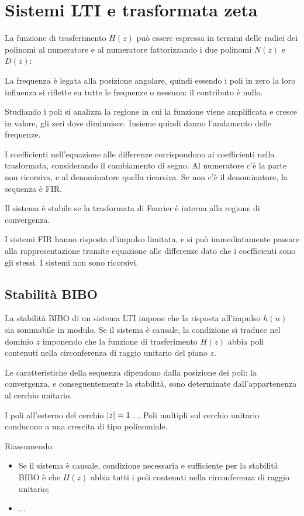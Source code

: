 \section{Sistemi LTI e trasformata zeta}
La funzione di trasferimento $H(z)$ può essere espressa in termini delle radici dei polinomi al numeratore e al numeratore fattorizzando i due polinomi $N(z)$ e $D(z)$:

La frequenza è legata alla posizione angolare, quindi essendo i poli in zero la loro influenza si riflette su tutte le frequenze o nessuna: il contributo è nullo.

Studiando i poli si analizza la regione in cui la funzione viene amplificata e cresce in valore, gli zeri dove diminuisce. Insieme quindi danno l'andamento delle frequenze.

I coefficienti nell'equazione alle differenze corrispondono ai coefficienti nella trasformata, considerando il cambiamento di segno. Al numeratore c'è la parte non ricorsiva, e al denominatore quella ricorsiva. Se non c'è il denominatore, la sequenza è FIR.

Il sistema è stabile se la trasformata di Fourier è interna alla regione di convergenza. 

I sistemi FIR hanno risposta d'impulso limitata, e si può immediatamente passare alla rappresentazione tramite equazione alle differenze dato che i coefficienti sono gli stessi. I sistemi non sono ricorsivi.

\subsection{Stabilità BIBO}
La stabilità BIBO di un sistema LTI impone che la risposta all'impulso $h(n)$ sia sommabile in modulo. Se il sistema è causale, la condizione si traduce nel dominio $z$ imponendo che la funzione di trasferimento $H(z)$ abbia poli contenuti nella circonferenza di raggio unitario del piano $z$. 

Le caratteristiche della sequenza dipendono dalla posizione dei poli: la convergenza, e conseguentemente la stabilità, sono determinate dall'appartenenza al cerchio unitario.

I poli all'esterno del cerchio $\left|z\right| = 1$ ...
Poli multipli sul cerchio unitario conducono a una crescita di tipo polinomiale. 

Riassumendo:
\begin{itemize}
	\item Se il sistema è causale, condizione necessaria e sufficiente per la stabilità BIBO è che $H(z)$ abbia tutti i poli contenuti nella circonferenza di raggio unitario;
	\item ...
\end{itemize}

